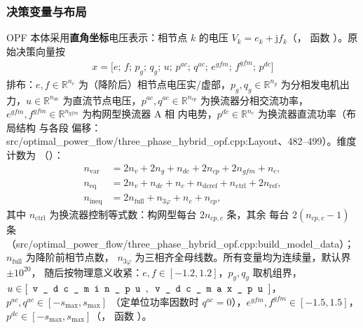 \subsubsection*{决策变量与布局}
OPF 本体采用\textbf{直角坐标}电压表示：相节点 $k$ 的电压
$V_k=e_k+\mathrm{j}f_k$（，
函数 ）。原始决策向量按
\begin{align*}
x=\bigl[e;\,f;\,p_g;\,q_g;\,u;\,p^{ac};\,q^{ac};\,e^{gfm};\,f^{gfm};\,p^{dc}\bigr]
\end{align*}
排布：$e,f\in\mathbb{R}^{n_v}$ 为（降阶后）相节点电压实/虚部，$p_g,q_g\in\mathbb{R}^{n_g}$
为分相发电机出力，$u\in\mathbb{R}^{n_{dc}}$ 为直流节点电压，$p^{ac},q^{ac}\in\mathbb{R}^{n_{cp}}$
为换流器分相交流功率，$e^{gfm},f^{gfm}\in\mathbb{R}^{n_{gfm}}$ 为构网型换流器 A 相
内电势，$p^{dc}\in\mathbb{R}^{n_c}$ 为换流器直流功率（布局结构  与各段
偏移：src/optimal\_power\_flow/three\_phase\_hybrid\_opf.cpp:Layout、482--499）。维度计数为
（）：
\begin{align*}
n_{\mathrm{var}} &= 2n_v+2n_g+n_{dc}+2n_{cp}+2n_{gfm}+n_c,\\
n_{\mathrm{eq}} &= 2n_v+n_{dc}+n_c+n_{\mathrm{dcref}}+n_{\mathrm{ctrl}}+2n_{\mathrm{ref}},\\
n_{\mathrm{ineq}} &= 2n_{\mathrm{full}}+n_{3\varphi}+n_c+n_{cp},
\end{align*}
其中 $n_{\mathrm{ctrl}}$ 为换流器控制等式数：构网型每台 $2n_{cp,c}$ 条，其余
每台 $2(n_{cp,c}-1)$ 条（src/optimal\_power\_flow/three\_phase\_hybrid\_opf.cpp:build\_model\_data）；$n_{\mathrm{full}}$ 为降阶前相节点数，
$n_{3\varphi}$ 为三相齐全母线数。所有变量均为连续量，默认界 $\pm10^{20}$，
随后按物理意义收紧：$e,f\in[-1.2,1.2]$，$p_g,q_g$ 取机组界，
$u\in[\fld{v\_dc\_min\_pu},\fld{v\_dc\_max\_pu}]$，$p^{ac},q^{ac}\in[-s_{\max},s_{\max}]$
（定单位功率因数时 $q^{ac}=0$），$e^{gfm},f^{gfm}\in[-1.5,1.5]$，
$p^{dc}\in[-s_{\max},s_{\max}]$（，
函数 ）。

